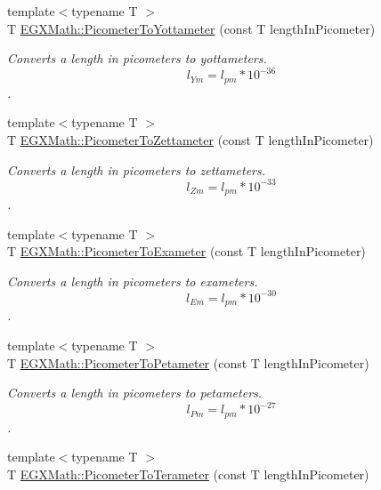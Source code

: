 \begin{DoxyCompactItemize}
{\footnotesize template$<$typename T $>$ }\\T \mbox{\hyperlink{group___e_g_x_math-_conversions-_length_conversions-_s_i-_picometer-_s_i_ga02d71cee34c4570a0c17529eb481a26f}{E\+G\+X\+Math\+::\+Picometer\+To\+Yottameter}} (const T length\+In\+Picometer)
\begin{DoxyCompactList}\small\item\em Converts a length in picometers to yottameters. \[ l_{Ym}=l_{pm} * 10^{-36} \]. \end{DoxyCompactList}\item 
{\footnotesize template$<$typename T $>$ }\\T \mbox{\hyperlink{group___e_g_x_math-_conversions-_length_conversions-_s_i-_picometer-_s_i_gae3d104d5bddc3f76d951fb0c86aa31ca}{E\+G\+X\+Math\+::\+Picometer\+To\+Zettameter}} (const T length\+In\+Picometer)
\begin{DoxyCompactList}\small\item\em Converts a length in picometers to zettameters. \[ l_{Zm}=l_{pm} * 10^{-33} \]. \end{DoxyCompactList}\item 
{\footnotesize template$<$typename T $>$ }\\T \mbox{\hyperlink{group___e_g_x_math-_conversions-_length_conversions-_s_i-_picometer-_s_i_gaa62371decac9806280c05abaffc3b460}{E\+G\+X\+Math\+::\+Picometer\+To\+Exameter}} (const T length\+In\+Picometer)
\begin{DoxyCompactList}\small\item\em Converts a length in picometers to exameters. \[ l_{Em}=l_{pm} * 10^{-30} \]. \end{DoxyCompactList}\item 
{\footnotesize template$<$typename T $>$ }\\T \mbox{\hyperlink{group___e_g_x_math-_conversions-_length_conversions-_s_i-_picometer-_s_i_ga491c4ac277c5b63710e9d11aa4b1ecc4}{E\+G\+X\+Math\+::\+Picometer\+To\+Petameter}} (const T length\+In\+Picometer)
\begin{DoxyCompactList}\small\item\em Converts a length in picometers to petameters. \[ l_{Pm}=l_{pm} * 10^{-27} \]. \end{DoxyCompactList}\item 
{\footnotesize template$<$typename T $>$ }\\T \mbox{\hyperlink{group___e_g_x_math-_conversions-_length_conversions-_s_i-_picometer-_s_i_ga208383d9423614bbd8ddf3731114e31e}{E\+G\+X\+Math\+::\+Picometer\+To\+Terameter}} (const T length\+In\+Picometer)

\end{DoxyCompactItemize}
